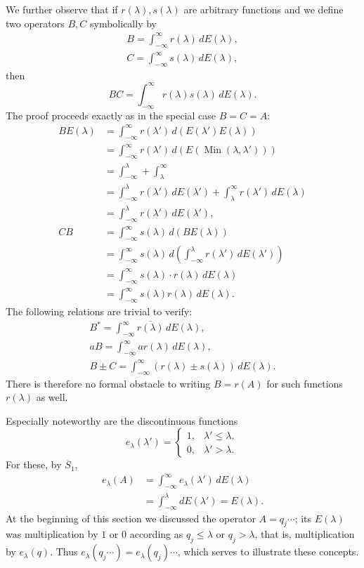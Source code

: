 \documentclass[fontsize=13pt,twoside,openany,headings=normal,parskip=false,bookmarkpackage=false,DIV=calc]{scrbook}
\begin{document}
We further observe that if $r(\lambda),s(\lambda)$ are arbitrary functions and we define two operators $B,C$ symbolically by
\begin{gather*}
B=\int_{-\infty}^{\infty}r(\lambda)\,dE(\lambda),\\
C=\int_{-\infty}^{\infty}s(\lambda)\,dE(\lambda),
\end{gather*}
then
\[
BC=\int_{-\infty}^{\infty}r(\lambda)s(\lambda)\,dE(\lambda).
\]
The proof proceeds exactly as in the special case $B=C=A$:
\begin{align*}
BE(\lambda)&=\int_{-\infty}^{\infty}r(\lambda')\,d(E(\lambda')E(\lambda))\\
&=\int_{-\infty}^{\infty}r(\lambda')\,d(E(\operatorname{Min}(\lambda,\lambda')))\\
&=\int_{-\infty}^{\lambda}+\int_\lambda^{\infty}\\
&=\int_{-\infty}^{\lambda}r(\lambda')\,dE(\lambda')+\int_\lambda^{\infty}r(\lambda')\,dE(\lambda)\\
&=\int_{-\infty}^{\lambda}r(\lambda')\,dE(\lambda'),\\
CB&=\int_{-\infty}^{\infty}s(\lambda)\,d(BE(\lambda))\\
&=\int_{-\infty}^{\infty}s(\lambda)\,d\left(\int_{-\infty}^{\lambda}r(\lambda')\,dE(\lambda')\right)\\
&=\int_{-\infty}^{\infty}s(\lambda)\cdot r(\lambda)\,dE(\lambda)\\
&=\int_{-\infty}^{\infty}s(\lambda)r(\lambda)\,dE(\lambda).
\end{align*}
The following relations are trivial to verify:
\begin{gather*}
B^*=\int_{-\infty}^{\infty}\overline{r(\lambda)}\,dE(\lambda),\\
aB=\int_{-\infty}^{\infty}ar(\lambda)\,dE(\lambda),\\
B\pm C=\int_{-\infty}^{\infty}(r(\lambda)\pm s(\lambda))\,dE(\lambda).
\end{gather*}
There is therefore no formal obstacle to writing $B=r(A)$ for such functions $r(\lambda)$ as well.

\hypertarget{origpage-75}{}%
Especially noteworthy are the discontinuous functions
\[
e_\lambda(\lambda')=\begin{cases}1,&\lambda'\leq\lambda,\\0,&\lambda'>\lambda.\end{cases}
\]
For these, by $\hyperref[cond:II.Sbar1]{\overline{S}_1}$,
\begin{align*}
e_\lambda(A)&=\int_{-\infty}^{\infty}e_\lambda(\lambda')\,dE(\lambda)\\
&=\int_{-\infty}^{\lambda}dE(\lambda')=E(\lambda).
\end{align*}
At the beginning of this section we discussed the operator $A=q_j\cdots$; its $E(\lambda)$ was multiplication by $1$ or $0$ according as $q_j\leq\lambda$ or $q_j>\lambda$, that is, multiplication by $e_\lambda(q)$. Thus $e_\lambda(q_j\cdots)=e_\lambda(q_j)\cdots$, which serves to illustrate these concepts.
\end{document}
